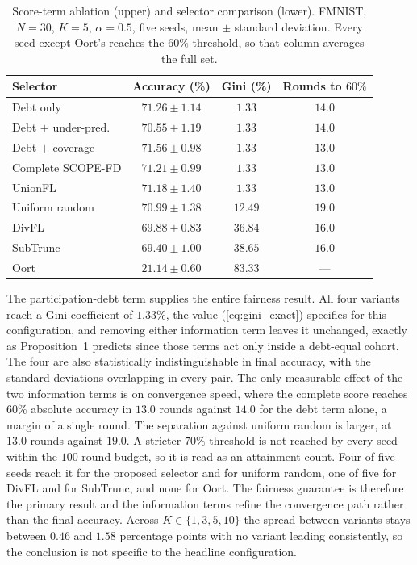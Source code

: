 \documentclass[journal]{IEEEtran}
\newcommand{\rev}[1]{#1}
\begin{document}
\begin{table}[t]
\centering
\caption{\rev{Score-term ablation (upper) and selector comparison (lower). FMNIST, $N=30$, $K=5$, $\alpha=0.5$, five seeds, mean $\pm$ standard deviation. Every seed except Oort's reaches the $60\%$ threshold, so that column averages the full set.}}
\label{tab:headline}
\renewcommand{\arraystretch}{1.15}
\footnotesize
\setlength{\tabcolsep}{4pt}
\begin{tabular}{@{}lccc@{}}
\toprule
\textbf{Selector} & \textbf{Accuracy (\%)} & \textbf{Gini (\%)} & \textbf{Rounds to $60\%$} \\
\midrule
Debt only              & $71.26 \pm 1.14$ & $1.33$  & $14.0$ \\
Debt $+$ under-pred.   & $70.55 \pm 1.19$ & $1.33$  & $14.0$ \\
Debt $+$ coverage      & $71.56 \pm 0.98$ & $1.33$  & $13.0$ \\
Complete SCOPE-FD      & $71.21 \pm 0.99$ & $1.33$  & $13.0$ \\
\midrule
UnionFL \cite{castillo2024unionfl}  & $71.18 \pm 1.40$ & $1.33$  & $13.0$ \\
Uniform random      & $70.99 \pm 1.38$ & $12.49$ & $19.0$ \\
DivFL \cite{balakrishnan2022divfl}   & $69.88 \pm 0.83$ & $36.84$ & $16.0$ \\
SubTrunc \cite{castillo2024subtrunc} & $69.40 \pm 1.00$ & $38.65$ & $16.0$ \\
Oort \cite{lai2021oort}              & $21.14 \pm 0.60$ & $83.33$ & --- \\
\bottomrule
\end{tabular}
\end{table}

\rev{The participation-debt term supplies the entire fairness result. All four variants reach a Gini coefficient of $1.33\%$, the value (\ref{eq:gini_exact}) specifies for this configuration, and removing either information term leaves it unchanged, exactly as Proposition~1 predicts since those terms act only inside a debt-equal cohort. The four are also statistically indistinguishable in final accuracy, with the standard deviations overlapping in every pair. The only measurable effect of the two information terms is on convergence speed, where the complete score reaches $60\%$ absolute accuracy in $13.0$ rounds against $14.0$ for the debt term alone, a margin of a single round. The separation against uniform random is larger, at $13.0$ rounds against $19.0$. A stricter $70\%$ threshold is not reached by every seed within the $100$-round budget, so it is read as an attainment count. Four of five seeds reach it for the proposed selector and for uniform random, one of five for DivFL and for SubTrunc, and none for Oort. The fairness guarantee is therefore the primary result and the information terms refine the convergence path rather than the final accuracy. Across $K \in \{1, 3, 5, 10\}$ the spread between variants stays between $0.46$ and $1.58$ percentage points with no variant leading consistently, so the conclusion is not specific to the headline configuration.}
\end{document}
